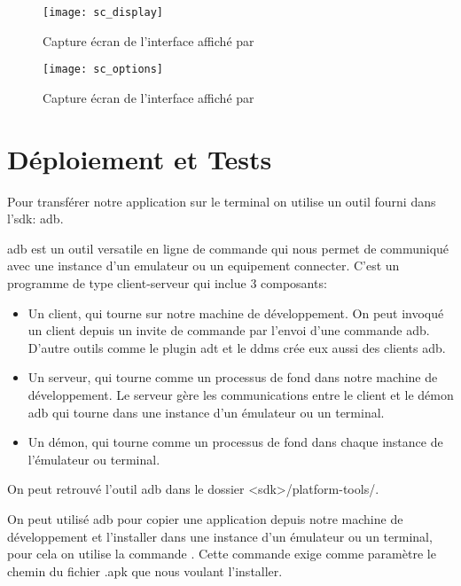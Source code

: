 \begin{figure}
\center
\texttt{[image: sc\_display]}
\caption{Capture écran de l'interface affiché par }
\label{fig:sc_display}
\end{figure}

\begin{figure}
\center
\texttt{[image: sc\_options]}
\caption{Capture écran de l'interface affiché par }
\label{fig:sc_options}
\end{figure}

\section{Déploiement et Tests}

Pour transférer notre application sur le terminal \android{} on utilise un outil fourni dans l'\gls{sdk}: \gls{adb}.

\gls{adb}\cite{tools:adb} est un outil versatile en ligne de commande qui nous permet de communiqué avec une instance d'un emulateur ou un equipement \android{} connecter. C'est un programme de type client-serveur qui inclue 3 composants:

\begin{itemize}

\item Un client, qui tourne sur notre machine de développement. On peut invoqué
un client depuis un invite de commande par l’envoi d'une commande \gls{adb}.
D'autre outils \android{} comme le plugin \gls{adt} et le \gls{ddms} crée eux
aussi des clients \gls{adb}.

\item Un serveur, qui tourne comme un processus de fond dans notre machine de
développement. Le serveur gère les communications entre le client et le démon
\gls{adb} qui tourne dans une instance d'un émulateur ou un terminal.

\item Un démon, qui tourne comme un processus de fond dans chaque instance de l’émulateur ou terminal.

\end{itemize}

On peut retrouvé l'outil \gls{adb} dans le dossier <sdk>/platform-tools/.

On peut utilisé \gls{adb} pour copier une application depuis notre machine de développement et l'installer dans une instance d'un émulateur ou un terminal, pour cela on utilise la commande . Cette commande exige comme paramètre le chemin du fichier .apk que nous voulant l'installer.


